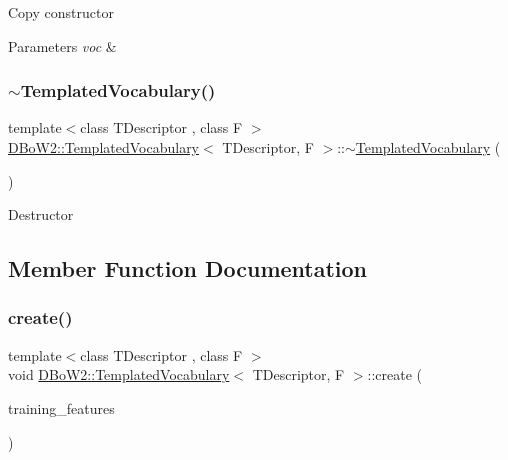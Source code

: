 Copy constructor 
\begin{DoxyParams}{Parameters}
{\em voc} & \\
\hline
\end{DoxyParams}
\mbox{\label{class_d_bo_w2_1_1_templated_vocabulary_a9d15f985a0c3badc1518be0fbe663099}} 
\subsubsection{\texorpdfstring{$\sim$\+Templated\+Vocabulary()}{~TemplatedVocabulary()}}
{\footnotesize\ttfamily template$<$class T\+Descriptor , class F $>$ \\
\mbox{\hyperlink{class_d_bo_w2_1_1_templated_vocabulary}{D\+Bo\+W2\+::\+Templated\+Vocabulary}}$<$ T\+Descriptor, F $>$\+::$\sim$\mbox{\hyperlink{class_d_bo_w2_1_1_templated_vocabulary}{Templated\+Vocabulary}} (\begin{DoxyParamCaption}{ }\end{DoxyParamCaption})\hspace{0.3cm}{\ttfamily [virtual]}}

Destructor 

\subsection{Member Function Documentation}
\mbox{\label{class_d_bo_w2_1_1_templated_vocabulary_a3679b5a8f2043021a4faab99ccfe4ebe}} 
\subsubsection{\texorpdfstring{create()}{create()}\hspace{0.1cm}{\footnotesize\ttfamily [1/3]}}
{\footnotesize\ttfamily template$<$class T\+Descriptor , class F $>$ \\
void \mbox{\hyperlink{class_d_bo_w2_1_1_templated_vocabulary}{D\+Bo\+W2\+::\+Templated\+Vocabulary}}$<$ T\+Descriptor, F $>$\+::create (\begin{DoxyParamCaption}\item[{const std\+::vector$<$ std\+::vector$<$ T\+Descriptor $>$ $>$ \&}]{training\+\_\+features }\end{DoxyParamCaption})\hspace{0.3cm}{\ttfamily [virtual]}}


